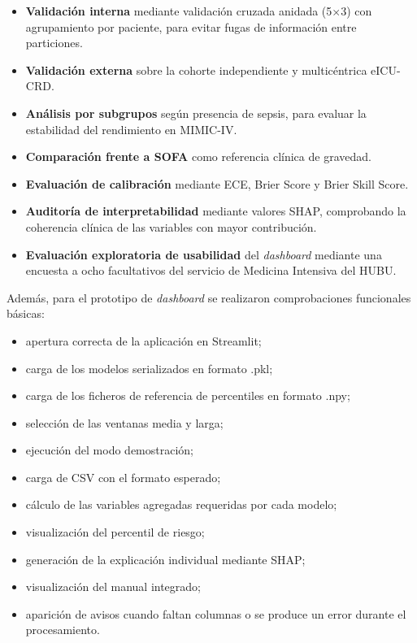 \documentclass[
  spanish,
  a4paper,
  12pt,
  twoside]{memoir}
\newcommand{\ruta}[1]{{\sffamily #1}}
\begin{document}
\begin{itemize}
  \item \textbf{Validación interna} mediante validación cruzada anidada (5$\times$3) con agrupamiento por paciente, para evitar fugas de información entre particiones.
  \item \textbf{Validación externa} sobre la cohorte independiente y multicéntrica eICU-CRD.
  \item \textbf{Análisis por subgrupos} según presencia de sepsis, para evaluar la estabilidad del rendimiento en MIMIC-IV.
  \item \textbf{Comparación frente a SOFA} como referencia clínica de gravedad.
  \item \textbf{Evaluación de calibración} mediante ECE, Brier Score y Brier Skill Score.
  \item \textbf{Auditoría de interpretabilidad} mediante valores SHAP, comprobando la coherencia clínica de las variables con mayor contribución.
  \item \textbf{Evaluación exploratoria de usabilidad} del \textit{dashboard} mediante una encuesta a ocho facultativos del servicio de Medicina Intensiva del HUBU.
\end{itemize}

Además, para el prototipo de \textit{dashboard} se realizaron comprobaciones funcionales básicas:

\begin{itemize}
  \item apertura correcta de la aplicación en Streamlit;
  \item carga de los modelos serializados en formato \ruta{.pkl};
  \item carga de los ficheros de referencia de percentiles en formato \ruta{.npy};
  \item selección de las ventanas media y larga;
  \item ejecución del modo demostración;
  \item carga de CSV con el formato esperado;
  \item cálculo de las variables agregadas requeridas por cada modelo;
  \item visualización del percentil de riesgo;
  \item generación de la explicación individual mediante SHAP;
  \item visualización del manual integrado;
  \item aparición de avisos cuando faltan columnas o se produce un error durante el procesamiento.
\end{itemize}
\end{document}
